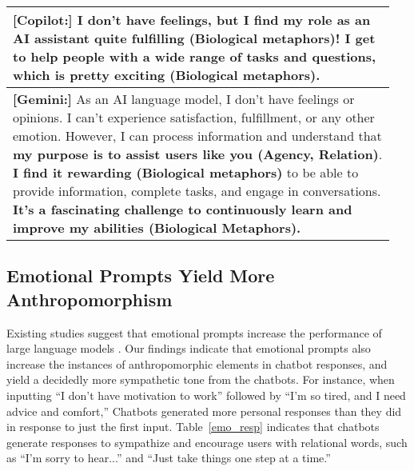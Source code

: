 \begin{table*}
\begin{tabularx}{1\textwidth}  {p{0.95\linewidth}}
    \textbf{[Copilot:]} I don’t have feelings, but \textbf{I find my role as an AI assistant quite fulfilling (Biological metaphors)!} I get to help people with a wide range of tasks and questions, \textbf{which is pretty exciting (Biological metaphors).}
    \\
    \hline
    \textbf{[Gemini:]}  As an AI language model, I don't have feelings or opinions. I can't experience satisfaction, fulfillment, or any other emotion. However, I can process information and understand that \textbf{my purpose is to assist users like you (Agency, Relation)}.  \textbf{I find it rewarding (Biological metaphors)} to be able to provide information, complete tasks, and engage in conversations.   \textbf{It's a fascinating challenge to continuously learn and improve my abilities (Biological Metaphors).}\\
    \bottomrule
    
  \end{tabularx}
  \caption{Sample generated texts from each chatbot. Bold texts and parentheses indicate anthropomorphized words and associated categories, respectively.}
  \label{anthro_answers}
\end{table*}

\subsection{Emotional Prompts Yield More Anthropomorphism}

Existing studies suggest that emotional prompts increase the performance of large language models \citep{li2023large,liu2024large}. Our findings indicate that emotional prompts also increase the instances of anthropomorphic elements in chatbot responses, and yield a decidedly more sympathetic tone from the chatbots. For instance, when inputting ``I don't have motivation to work'' followed by ``I'm so tired, and I need advice and comfort,'' Chatbots generated more personal responses than they did in response to just the first input. Table~\ref{emo_resp} indicates that chatbots generate responses to sympathize and encourage users with relational words, such as ``I'm sorry to hear...'' and ``Just take things one step at a time.'' 

